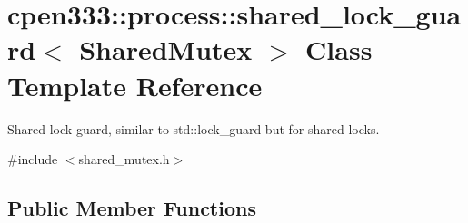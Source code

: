 \hypertarget{classcpen333_1_1process_1_1shared__lock__guard}{}\section{cpen333\+:\+:process\+:\+:shared\+\_\+lock\+\_\+guard$<$ Shared\+Mutex $>$ Class Template Reference}
\label{classcpen333_1_1process_1_1shared__lock__guard}


Shared lock guard, similar to std\+::lock\+\_\+guard but for shared locks.  




{\ttfamily \#include $<$shared\+\_\+mutex.\+h$>$}

\subsection*{Public Member Functions}

